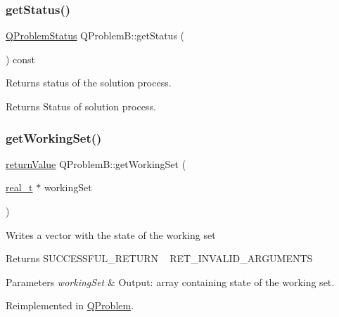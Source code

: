 \subsubsection{\texorpdfstring{get\+Status()}{getStatus()}}
{\footnotesize\ttfamily \hyperlink{_types_8hpp_a8d5ce5a92124dc0106a5720f6d9a5abd}{Q\+Problem\+Status} Q\+Problem\+B\+::get\+Status (\begin{DoxyParamCaption}{ }\end{DoxyParamCaption}) const\hspace{0.3cm}{\ttfamily [inline]}}

Returns status of the solution process. \begin{DoxyReturn}{Returns}
Status of solution process. 
\end{DoxyReturn}
\mbox{\label{class_q_problem_b_a29c4cdd661701580f1ebe1e78804bd43}} 
\subsubsection{\texorpdfstring{get\+Working\+Set()}{getWorkingSet()}}
{\footnotesize\ttfamily \hyperlink{_message_handling_8hpp_a81d556f613bfbabd0b1f9488c0fa865e}{return\+Value} Q\+Problem\+B\+::get\+Working\+Set (\begin{DoxyParamCaption}\item[{\hyperlink{qp_o_a_s_e_s__wrapper_8h_a0d00e2b3dfadee81331bbb39068570c4}{real\+\_\+t} $\ast$}]{working\+Set }\end{DoxyParamCaption})\hspace{0.3cm}{\ttfamily [virtual]}}

Writes a vector with the state of the working set \begin{DoxyReturn}{Returns}
S\+U\+C\+C\+E\+S\+S\+F\+U\+L\+\_\+\+R\+E\+T\+U\+RN ~\newline
 R\+E\+T\+\_\+\+I\+N\+V\+A\+L\+I\+D\+\_\+\+A\+R\+G\+U\+M\+E\+N\+TS 
\end{DoxyReturn}

\begin{DoxyParams}{Parameters}
{\em working\+Set} & Output\+: array containing state of the working set. \\
\hline
\end{DoxyParams}


Reimplemented in \hyperlink{class_q_problem_a133ed005f9da3dd7dc45159b1fdc9d2d}{Q\+Problem}.


